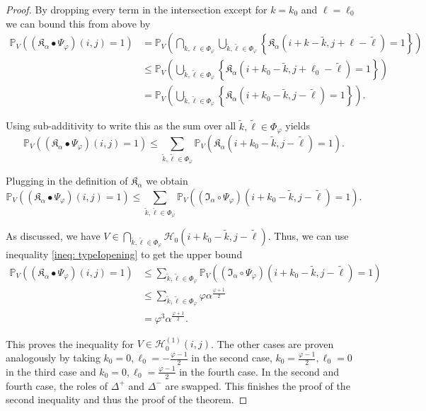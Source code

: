 \documentclass[a4paper,12pt]{article}
\theoremstyle{plain}
\theoremstyle{definition}
\begin{document}
\begin{proof}
	By dropping every term in the intersection except for $k = k_0$ and $\ell = \ell_0$ we can bound this from above by
	\begin{align*}
		\mathbb{P}_V\left( (\mathfrak{K}_\alpha \bullet \Psi_\varphi)(i, j) = 1 \right) &= \mathbb{P}_V\left( \bigcap_{k, \ell \in \Phi_\varphi} \bigcup_{\tilde{k}, \tilde{\ell} \in \Phi_\varphi} \left\{ \mathfrak{K}_\alpha(i + k - \tilde{k}, j + \ell - \tilde{\ell}) = 1 \right\} \right) \\
		&\leq \mathbb{P}_V\left( \bigcup_{\tilde{k}, \tilde{\ell} \in \Phi_\varphi} \left\{ \mathfrak{K}_\alpha(i + k_0 - \tilde{k}, j + \ell_0 - \tilde{\ell}) = 1 \right\} \right) \\
		&= \mathbb{P}_V\left( \bigcup_{\tilde{k}, \tilde{\ell} \in \Phi_\varphi} \left\{ \mathfrak{K}_\alpha(i + k_0 - \tilde{k}, j - \tilde{\ell}) = 1 \right\} \right).
	\end{align*}
	
	Using sub-additivity to write this as the sum over all $\tilde{k}, \tilde{\ell} \in \Phi_\varphi$ yields
	\begin{equation*}
		\mathbb{P}_V\left( (\mathfrak{K}_\alpha \bullet \Psi_\varphi)(i, j) = 1 \right) \leq \sum_{\tilde{k}, \tilde{\ell} \in \Phi_\varphi} \mathbb{P}_V\left( \mathfrak{K}_\alpha(i + k_0 - \tilde{k}, j - \tilde{\ell}) = 1 \right).
	\end{equation*}
	
	Plugging in the definition of $\mathfrak{K}_\alpha$ we obtain
	\begin{equation*}
		\mathbb{P}_V\left( (\mathfrak{K}_\alpha \bullet \Psi_\varphi)(i, j) = 1 \right) \leq \sum_{\tilde{k}, \tilde{\ell} \in \Phi_\varphi} \mathbb{P}_V\left( (\mathfrak{I}_\alpha \circ \Psi_\varphi)(i + k_0 - \tilde{k}, j - \tilde{\ell}) = 1 \right).
	\end{equation*}
	
	As discussed, we have $V \in \bigcap_{\tilde{k}, \tilde{\ell} \in \Phi_\varphi} \mathcal{H}_0(i + k_0 - \tilde{k}, j - \tilde{\ell})$. Thus, we can use inequality \eqref{ineq: typeIopening} to get the upper bound
	\begin{align*}
		\mathbb{P}_V\left( (\mathfrak{K}_\alpha \bullet \Psi_\varphi)(i, j) = 1 \right) &\leq \sum_{\tilde{k}, \tilde{\ell} \in \Phi_\varphi} \mathbb{P}_V\left( (\mathfrak{I}_\alpha \circ \Psi_\varphi)(i + k_0 - \tilde{k}, j - \tilde{\ell}) = 1 \right) \\
		&\leq \sum_{\tilde{k}, \tilde{\ell} \in \Phi_\varphi} \varphi \alpha^{\frac{\varphi + 1}{2}} \\
		&= \varphi^3 \alpha^{\frac{\varphi + 1}{2}}.
	\end{align*}
	
	This proves the inequality for $V \in \mathcal{H}_0^{(1)}(i, j)$. The other cases are proven analogously by taking $k_0 = 0, \ell_0 = -\frac{\varphi - 1}{2}$ in the second case, $k_0 = \frac{\varphi - 1}{2}, \ell_0 = 0$ in the third case and $k_0 = 0, \ell_0 = \frac{\varphi - 1}{2}$ in the fourth case. In the second and fourth case, the roles of $\Delta^+$ and $\Delta^-$ are swapped. This finishes the proof of the second inequality and thus the proof of the theorem.
\end{proof}
\end{document}
